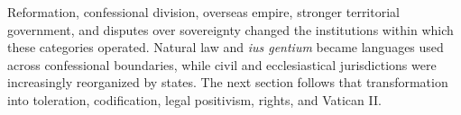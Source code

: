 Reformation, confessional division, overseas empire, stronger territorial government, and disputes over sovereignty changed the institutions within which these categories operated. Natural law and \emph{ius gentium} became languages used across confessional boundaries, while civil and ecclesiastical jurisdictions were increasingly reorganized by states. The next section follows that transformation into toleration, codification, legal positivism, rights, and Vatican II.
